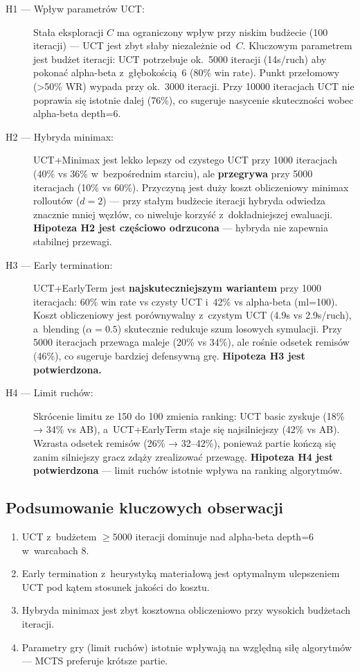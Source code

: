 \documentclass[12pt,a4paper]{article}
\begin{document}
\begin{description}
  \item[H1 — Wpływ parametrów UCT:] Stała eksploracji $C$ ma ograniczony wpływ przy niskim budżecie (100 iteracji) — UCT jest zbyt słaby niezależnie od~$C$. Kluczowym parametrem jest budżet iteracji: UCT potrzebuje ok.~5000 iteracji (14s/ruch) aby pokonać alpha-beta z~głębokością~6 (80\% win rate). Punkt przełomowy (>50\% WR) wypada przy ok.~3000 iteracji. Przy 10000 iteracjach UCT nie poprawia się istotnie dalej (76\%), co sugeruje nasycenie skuteczności wobec alpha-beta depth=6.
  
  \item[H2 — Hybryda minimax:] UCT+Minimax jest lekko lepszy od czystego UCT przy 1000 iteracjach (40\% vs 36\% w~bezpośrednim starciu), ale \textbf{przegrywa} przy 5000 iteracjach (10\% vs 60\%). Przyczyną jest duży koszt obliczeniowy minimax rolloutów ($d=2$) — przy stałym budżecie iteracji hybryda odwiedza znacznie mniej węzłów, co niweluje korzyść z~dokładniejszej ewaluacji. \textbf{Hipoteza H2 jest częściowo odrzucona} — hybryda nie zapewnia stabilnej przewagi.
  
  \item[H3 — Early termination:] UCT+EarlyTerm jest \textbf{najskuteczniejszym wariantem} przy 1000 iteracjach: 60\% win rate vs czysty UCT i~42\% vs alpha-beta (ml=100). Koszt obliczeniowy jest porównywalny z~czystym UCT (4.9s vs 2.9s/ruch), a~blending ($\alpha=0.5$) skutecznie redukuje szum losowych symulacji. Przy 5000 iteracjach przewaga maleje (20\% vs 34\%), ale rośnie odsetek remisów (46\%), co sugeruje bardziej defensywną grę. \textbf{Hipoteza H3 jest potwierdzona.}
  
  \item[H4 — Limit ruchów:] Skrócenie limitu ze 150 do 100 zmienia ranking: UCT basic zyskuje (18\% → 34\% vs AB), a~UCT+EarlyTerm staje się najsilniejszy (42\% vs AB). Wzrasta odsetek remisów (26\% → 32--42\%), ponieważ partie kończą się zanim silniejszy gracz zdąży zrealizować przewagę. \textbf{Hipoteza H4 jest potwierdzona} — limit ruchów istotnie wpływa na ranking algorytmów.
\end{description}

\subsection{Podsumowanie kluczowych obserwacji}
\begin{enumerate}[nosep]
  \item UCT z~budżetem $\geq 5000$ iteracji dominuje nad alpha-beta depth=6 w~warcabach 8.
  \item Early termination z~heurystyką materiałową jest optymalnym ulepszeniem UCT pod kątem stosunek jakości do kosztu.
  \item Hybryda minimax jest zbyt kosztowna obliczeniowo przy wysokich budżetach iteracji.
  \item Parametry gry (limit ruchów) istotnie wpływają na względną siłę algorytmów — MCTS preferuje krótsze partie.
\end{enumerate}
\end{document}
